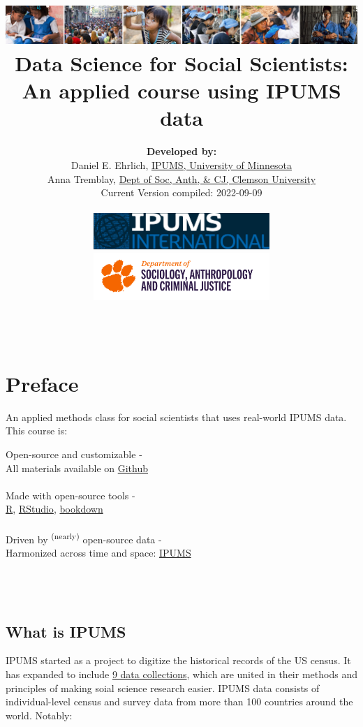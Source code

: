 \documentclass[
]{book}
\title{\includegraphics{ipums_banner.png}\\
Data Science for Social Scientists:\\
An applied course using IPUMS data}
\author{\textbf{Developed by:}\\
\hspace*{0.333em}\hspace*{0.333em}Daniel E. Ehrlich, \href{https://international.ipums.org/international/}{IPUMS, University of Minnesota}\\
\hspace*{0.333em}\hspace*{0.333em}Anna Tremblay, \href{https://www.clemson.edu/cbshs/departments/sacj/degrees/anthropology.html}{Dept of Soc, Anth, \& CJ, Clemson University}\\
\hspace*{0.333em}\hspace*{0.333em}Current Version compiled: 2022-09-09\\
~\\
\includegraphics[width=0.5\textwidth,height=\textheight]{ipums_i_logo.jpg}\\
\includegraphics[width=0.5\textwidth,height=\textheight]{clemson_logo.png}\\
~\\
~\\}
\date{}
\begin{document}
\maketitle

{
\setcounter{tocdepth}{1}
\tableofcontents
}
\hypertarget{preface}{%
\chapter*{Preface}\label{preface}}

An applied methods class for social scientists that uses real-world IPUMS data. This course is:

Open-source and customizable -\\
\hspace*{0.333em}\hspace*{0.333em}\hspace*{0.333em}All materials available on \href{https://github.com/ehrlichd/stats_book}{Github}\\
~\\
Made with open-source tools -\\
\hspace*{0.333em}\hspace*{0.333em}\href{https://cran.r-project.org/}{R}, \href{https://www.rstudio.com/products/rstudio/}{RStudio}, \href{https://bookdown.org/}{bookdown}\\
~\\
Driven by \textsuperscript{(nearly)} open-source data -\\
\hspace*{0.333em}\hspace*{0.333em}Harmonized across time and space: \href{https://ipums.org}{IPUMS}\\
~\\
~\\

~\\

\hypertarget{what-is-ipums}{%
\section*{What is IPUMS}\label{what-is-ipums}}

IPUMS started as a project to digitize the historical records of the US census. It has expanded to include \href{https://www.ipums.org/}{9 data collections}, which are united in their methods and principles of making soial science research easier. IPUMS data consists of individual-level census and survey data from more than 100 countries around the world. Notably:
\end{document}
